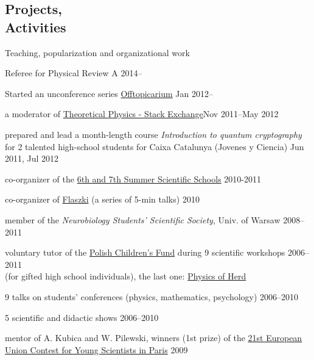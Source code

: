 \documentclass[margin,line]{resume}
\begin{document}
\begin{resume}
    \section{\mysidestyle Projects,\\Activities}
    Teaching, popularization and organizational work
        \begin{list2}
        \item Referee for Physical Review A \hfill { 2014--}
        \item Started an unconference series \href{http://offtopicarium.wikidot.com/en:start}{Offtopicarium} \hfill { Jan 2012--}
	    \item a moderator of \href{http://theoreticalphysics.stackexchange.com/}{Theoretical Physics - Stack Exchange}\hfill Nov 2011--May 2012
        \item prepared and lead a month-length course {\sl Introduction to quantum cryptography} for 2 talented high-school students for Caixa Catalunya (Jovenes y Ciencia) \hfill Jun 2011, Jul 2012
        \item co-organizer of the \href{http://warsztatywww.wikidot.com/en}{6th and 7th  Summer Scientific Schools} \hfill 2010-2011%
        \item co-organizer of \href{http://www.flaszki.waw.pl/}{Flaszki} (a series of 5-min talks) \hfill 2010
        \item member of the {\sl Neurobiology Students' Scientific Society}, Univ. of Warsaw  \hfill 2008--2011
        \item voluntary tutor of the \href{http://www.fundusz.org/?lang=gb}{Polish Children's Fund} during 9 scientific workshops \hfill 2006--2011\\
        (for gifted high school individuals), the last one: \href{http://migdal.wikidot.com/fizyka-stada}{Physics of Herd}
        \item 9 talks on students' conferences (physics, mathematics, psychology) \hfill 2006--2010
        \item 5 scientific and didactic shows \hfill 2006--2010
        \item mentor of A. Kubica and W. Pilewski, winners (1st prize) of the \href{http://www.eucys09.fr/}{21st European Union Contest for Young Scientists in Paris}  \hfill 2009

\end{list2}
\end{resume}
\end{document}
